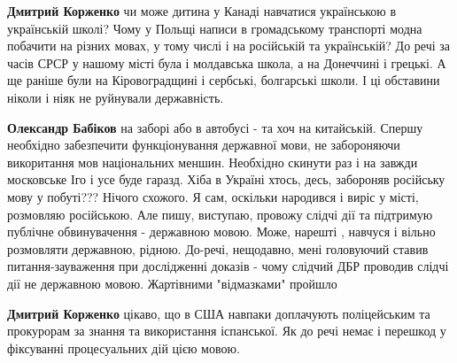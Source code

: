 \begin{itemize}
\begin{itemize}
 
\textbf{Дмитрий Корженко} чи може дитина у Канаді навчатися українською в
українській школі? Чому у Польщі написи в громадському транспорті модна
побачити на різних мовах, у тому числі і на російській та українській? До речі
за часів СРСР у нашому місті була і молдавська школа, а на Донеччині і грецькі.
А ще раніше були на Кіровоградщині і сербські, болгарські школи. І ці обставини
ніколи і ніяк не руйнували державність.

 
\textbf{Олександр Бабіков} на заборі або в автобусі - та хоч на китайській.
Спершу необхідно забезпечити функціонування державної мови, не забороняючи
викоритання мов національних меншин. Необхідно скинути раз і на завжди
московське Іго і усе буде гаразд. Хіба в Україні хтось, десь, забороняв
російську мову у побуті??? Нічого схожого. Я сам, оскільки народився і виріс у
місті, розмовляю російською. Але пишу, виступаю, провожу слідчі дії та
підтримую публічне обвинувачення - державною мовою. Може, нарешті , навчуся і
вільно розмовляти державною, рідною. До-речі, нещодавно, мені головуючий ставив
питання-зауваження при дослідженні доказів - чому слідчий ДБР проводив слідчі
дії не державною мовою. Жартівними "відмазками" пройшло

 
\textbf{Дмитрий Корженко} цікаво, що в США навпаки доплачують поліцейським та
прокурорам за знання та використання іспанської. Як до речі немає і перешкод у
фіксуванні процесуальних дій цією мовою.

 

\end{itemize}
\end{itemize}
